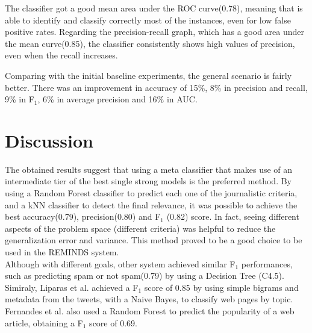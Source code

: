The classifier got a good mean area under the ROC curve(0.78), meaning that is able to identify and classify correctly most of the instances, even for low false positive rates. Regarding the precision-recall graph, which has a good area under the mean curve(0.85), the classifier consistently shows high values of precision, even when the recall increases.

Comparing with the initial baseline experiments, the general scenario is fairly better. There was an improvement in accuracy of 15\%, 8\% in precision and recall, 9\% in F$_1$, 6\% in average precision and 16\% in AUC.

\section{Discussion}

The obtained results suggest that using a meta classifier that makes use of an intermediate tier of the best single strong models is the preferred method. By using a Random Forest classifier to predict each one of the journalistic criteria, and a kNN classifier to detect the final relevance, it was possible to achieve the best accuracy(0.79), precision(0.80) and F$_1$ (0.82) score. In fact, seeing different aspects of the problem space (different criteria) was helpful to reduce the generalization error and variance. This method proved to be a good choice to be used in the REMINDS system. \\
Although with different goals, other system achieved similar F$_1$ performances, such as predicting spam or not spam(0.79) \citep{Irani2010TrendStuff} by using a Decision Tree (C4.5). Simiraly, Liparas et al.\citep{Liparas2014NewsClassification} achieved a F$_1$ score of 0.85 by using simple bigrams and metadata from the tweets, with a Naive Bayes, to classify web pages by topic. Fernandes et al. \citep{Fernandes2015PredictingPopularity} also used a Random Forest to predict the popularity of a web article, obtaining a F$_1$ score of 0.69.




